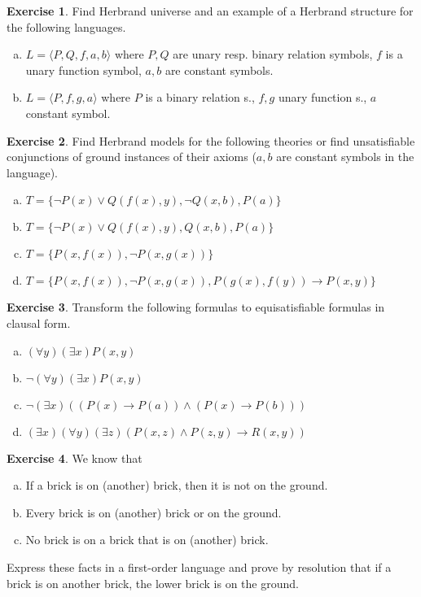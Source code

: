 \documentclass[11pt,a4paper]{amsart}
\theoremstyle{definition}
\newtheorem{problem}{Exercise}
\theoremstyle{remark}
\begin{document}
\bigskip

\begin{problem} Find Herbrand universe and an example of a Herbrand structure for the following languages.
\medskip
\begin{enumerate}[(a)]
\itemsep12pt
\item $L=\langle P,Q,f,a,b \rangle$ where $P,Q$ are unary resp. binary relation symbols, $f$ is a unary function symbol, $a,b$ are constant symbols.
\item $L=\langle P,f,g,a \rangle$ where $P$ is a binary relation s., $f,g$ unary function s., $a$ constant symbol.
\end{enumerate}
\end{problem}

\bigskip



\begin{problem} Find Herbrand models for the following theories or find unsatisfiable conjunctions of ground instances of their axioms ($a,b$ are constant symbols in the language).
\medskip
\begin{enumerate}[(a)]
\itemsep12pt
\item $T=\{\neg P(x)\vee Q(f(x),y), \neg Q(x,b), P(a)\}$
\item $T=\{\neg P(x)\vee Q(f(x),y), Q(x,b), P(a)\}$
\item $T=\{P(x,f(x)),\neg P(x,g(x))\}$
\item $T=\{P(x,f(x)),\neg P(x,g(x)), P(g(x),f(y)) \to P(x,y)\}$
\end{enumerate}
\end{problem}

\bigskip

\begin{problem} Transform the following formulas to equisatisfiable formulas in clausal form.
\medskip
\begin{enumerate}[(a)]
\itemsep12pt
\item $(\forall y)(\exists x)P(x,y)$
\item $\neg (\forall y)(\exists x)P(x,y)$
\item $\neg (\exists x)((P(x)\to P(a))\wedge (P(x)\to P(b)))$
\item $(\exists x)(\forall y)(\exists z)(P(x,z)\wedge P(z,y) \to R(x,y))$
\end{enumerate}
\end{problem}

\bigskip

\begin{problem} We know that
\medskip
\begin{enumerate}[(a)]
\itemsep12pt
\item If a brick is on (another) brick, then it is not on the ground.
\item Every brick is on (another) brick or on the ground.
\item No brick is on a brick that is on (another) brick.
\end{enumerate}
\medskip
Express these facts in a first-order language and prove by resolution that if a brick is on another brick, the lower brick is on the ground.
\end{problem}
\end{document}
